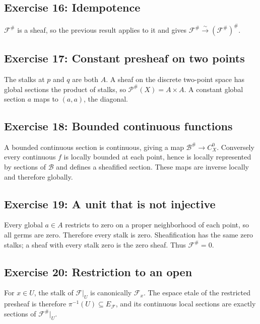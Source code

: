 \subsection*{Exercise 16: Idempotence}
\begin{solution}
$\mathcal F^\#$ is a sheaf, so the previous result applies to it and gives $\mathcal F^\#\xrightarrow{\sim}(\mathcal F^\#)^\#$.
\end{solution}

\subsection*{Exercise 17: Constant presheaf on two points}
\begin{solution}
The stalks at $p$ and $q$ are both $A$.  A sheaf on the discrete two-point space has global sections the product of stalks, so $\mathcal P^\#(X)=A\times A$.  A constant global section $a$ maps to $(a,a)$, the diagonal.
\end{solution}

\subsection*{Exercise 18: Bounded continuous functions}
\begin{solution}
A bounded continuous section is continuous, giving a map $\mathcal B^\#\to C^0_X$.  Conversely every continuous $f$ is locally bounded at each point, hence is locally represented by sections of $\mathcal B$ and defines a sheafified section.  These maps are inverse locally and therefore globally.
\end{solution}

\subsection*{Exercise 19: A unit that is not injective}
\begin{solution}
Every global $a\in A$ restricts to zero on a proper neighborhood of each point, so all germs are zero.  Therefore every stalk is zero.  Sheafification has the same zero stalks; a sheaf with every stalk zero is the zero sheaf.  Thus $\mathcal F^\#=0$.
\end{solution}

\subsection*{Exercise 20: Restriction to an open}
\begin{solution}
For $x\in U$, the stalk of $\mathcal F|_U$ is canonically $\mathcal F_x$.  The espace etale of the restricted presheaf is therefore $\pi^{-1}(U)\subseteq E_\mathcal F$, and its continuous local sections are exactly sections of $\mathcal F^\#|_U$.
\end{solution}

